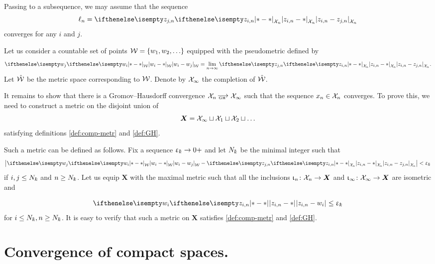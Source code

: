Passing to a subsequence, we may assume that the sequence \[\ell_n=\dist{z_{i,n}}{z_{j,n}}{\spc{X}_n}\] 
converges for any $i$ and $j$.

Let us consider a countable set of points $\spc{W}=\{w_1,w_2,\dots\}$
equipped with the pseudometric defined by 
\[\dist{w_i}{w_j}{\spc{W}}
=
\lim_{n\to\infty}\dist{z_{i,n}}{z_{j,n}}{\spc{X}_n}.\]
Let $\hat{\mathcal{W}}$ be the metric space corresponding to $\mathcal{W}$.
Denote by
$\mathcal{X}_\infty$ the completion of $\hat{\mathcal{W}}$.

It remains to show that there is a Gromov--Hausdorff convergence 
$\spc{X}_n\GHto\spc{X}_\infty$ such that the sequence $x_n\in\spc{X}_n$ converges.
To prove this, we need to construct a metric on the disjoint union of \[\bm{X}=\spc{X}_\infty\sqcup\spc{X}_1\sqcup\spc{X}_2\sqcup\dots\] 
satisfying definitions \ref{def:comp-metr} and \ref{def:GH}.

Such a  metric can be defined as follows.
Fix a sequence $\eps_\kay\to0+$
and let $N_\kay$ be the minimal integer such that
\[\left|\dist{w_i}{w_j}{\spc{W}}
-
\dist{z_{i,n}}{z_{j,n}}{\spc{X}_n}\right|<\eps_\kay
\]
if $i,j\le N_\kay$ and $n\ge N_\kay$. 
Let us equip $\bm{X}$ with the maximal metric such that all the inclusions $\iota_n\:\spc{X}_n\to\bm X$  and $\iota_\infty\:\spc{X}_\infty\to\bm X$ are isometric and 

\[
\dist{z_{i,n}}{w_i}{}\le \eps_\kay
\]
for $i\le N_\kay, n\ge N_\kay$.
It is easy to verify  that such a metric on $\bm X$ satisfies  \ref{def:comp-metr} and \ref{def:GH}.


\qeds

\section{Convergence of compact spaces.}

